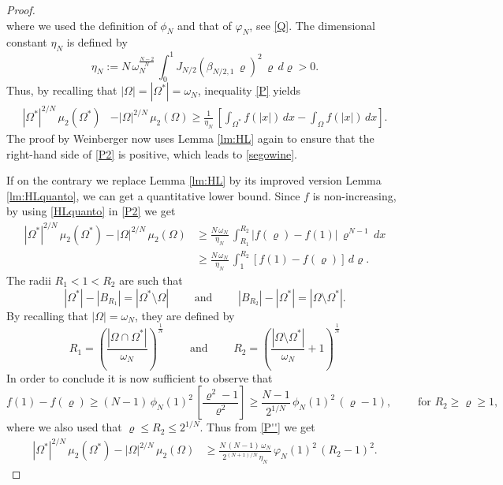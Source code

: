 \documentclass{amsart}
\theoremstyle{definition}
\numberwithin{equation}{section}
\begin{document}
\begin{proof}
\[\]
where we used the definition of $\phi_N$ and that of $\varphi_N$, see \eqref{Q}.
The dimensional constant $\eta_N$ is defined by
\[
\eta_N:=N\,\omega_N^\frac{N-2}{N}\, \int_0^1 J_{N/2}(\beta_{N/2,1}\,\varrho)^2\,\varrho\, d\varrho>0.
\] 
Thus, by recalling that $|\Omega|=|\Omega^*|=\omega_N$, inequality \eqref{P} yields
\begin{equation}
\label{P2}
\begin{split}
|\Omega^*|^{2/N}\,\mu_2(\Omega^*) &- |\Omega|^{2/N}\,\mu_2(\Omega)\ge \frac{1}{\eta_N}\,\left[\int_{\Omega^*} f(|x|)\, dx-\int_\Omega f(|x|)\, dx\right].
\end{split}
\end{equation}
The proof by Weinberger now uses Lemma \ref{lm:HL} again to ensure that the right-hand side of \eqref{P2} is positive, which leads to \eqref{segowine}. 
\par
If on the contrary we replace Lemma \ref{lm:HL} by its improved version Lemma \ref{lm:HLquanto}, we can get a quantitative lower bound. 
Since $f$ is non-increasing, by using \eqref{HLquanto} in \eqref{P2} we get
\begin{equation}
\label{P''}
\begin{split}
|\Omega^*|^{2/N}\, \mu_2(\Omega^*) - |\Omega|^{2/N}\,\mu_2(\Omega)& \ge \frac{N\,\omega_N}{\eta_N}\, \int_{R_1}^{R_2} |f(\varrho)-f(1)|\,\varrho^{N-1}\, dx\\
&\ge \frac{N\,\omega_N}{\eta_N}\,\int_{1}^{R_2} [f(1)-f(\varrho)]\,d\varrho. 
\end{split}
\end{equation}
The radii $R_1<1<R_2$ are such that 
\[
|\Omega^*|-|B_{R_1}|=|\Omega^*\setminus \Omega|\qquad \mbox{ and }\qquad |B_{R_2}|-|\Omega^*|=|\Omega\setminus \Omega^*|.
\]
By recalling that $|\Omega|=\omega_N$, they are defined by 
\[
R_1=\left(\frac{|\Omega\cap\Omega^*|}{\omega_N}\right)^\frac{1}{N}\qquad \mbox{ and }\qquad R_2=\left(\frac{|\Omega\setminus\Omega^*|}{\omega_N}+1\right)^\frac{1}{N}
\]
In order to conclude it is now sufficient to observe that
\[
f(1)-f(\varrho)\ge (N-1)\,\phi_N(1)^2\, \left[\frac{\varrho^2-1}{\varrho^2}\right]\ge\frac{N-1}{2^{1/N}}\,\phi_N(1)^2\, (\varrho-1),\qquad \mbox{ for }R_2\ge\varrho\ge 1,
\]
where we also used that $\varrho\le R_2\le 2^{1/N}$.
Thus from \eqref{P''} we get
\[
\begin{split}
|\Omega^*|^{2/N}\, \mu_2(\Omega^*) - |\Omega|^{2/N}\,\mu_2(\Omega)%
&\ge\frac{N\,(N-1)\,\omega_N}{2^{(N+1)/N}\,\eta_N}\,\varphi_N(1)^2\,\left(R_2-1\right)^2. 

\end{split}\]
\end{proof}
\end{document}

